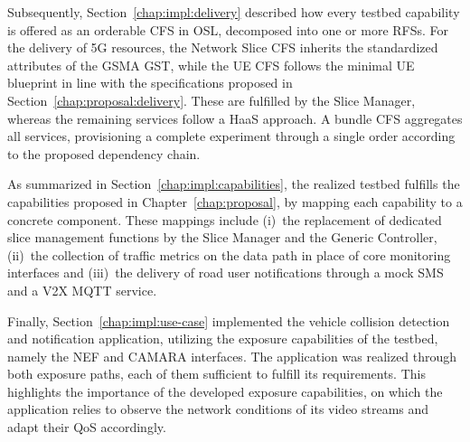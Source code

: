 Subsequently, Section~\ref{chap:impl:delivery} described how every testbed capability is offered as an orderable \acs{CFS} in \acs{OSL}, decomposed into one or more \acsp{RFS}. For the delivery of \acs{5G} resources, the Network Slice \acs{CFS} inherits the standardized attributes of the \acs{GSMA} \acs{GST}, while the \acs{UE} \acs{CFS} follows the minimal \acs{UE} blueprint in line with the specifications proposed in Section~\ref{chap:proposal:delivery}. These are fulfilled by the Slice Manager, whereas the remaining services follow a \acs{HaaS} approach. A bundle \acs{CFS} aggregates all services, provisioning a complete experiment through a single order according to the proposed dependency chain.

As summarized in Section~\ref{chap:impl:capabilities}, the realized testbed fulfills the capabilities proposed in Chapter~\ref{chap:proposal}, by mapping each capability to a concrete component. These mappings include (i)~the replacement of dedicated slice management functions by the Slice Manager and the Generic Controller, (ii)~the collection of traffic metrics on the data path in place of core monitoring interfaces and (iii)~the delivery of road user notifications through a mock \acs{SMS} and a \acs{V2X} \acs{MQTT} service.

Finally, Section~\ref{chap:impl:use-case} implemented the vehicle collision detection and notification application, utilizing the exposure capabilities of the testbed, namely the \acs{NEF} and CAMARA interfaces. The application was realized through both exposure paths, each of them sufficient to fulfill its requirements. This highlights the importance of the developed exposure capabilities, on which the application relies to observe the network conditions of its video streams and adapt their \acs{QoS} accordingly.
